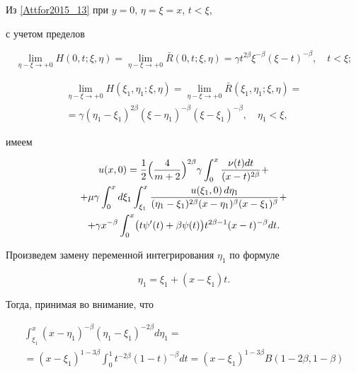 Из \eqref{Attfor2015_13} при $y=0$, $\eta=\xi=x$, $t<\xi$, 

с учетом пределов

$$

\lim\limits_{\eta-\xi\rightarrow +0} H(0,t;\xi,\eta)=

\lim\limits_{\eta-\xi\rightarrow +0} \bar{R}(0,t;\xi,\eta)=

\gamma t^{2\beta}\xi^{-\beta} (\xi-t)^{-\beta}, \quad t<\xi;

$$

\begin{multline}

\lim\limits_{\eta-\xi\rightarrow +0} H(\xi_1,\eta_1;\xi,\eta)=

\lim\limits_{\eta-\xi\rightarrow +0} \bar{R}(\xi_1,\eta_1;\xi,\eta)= \\ =

\gamma (\eta_1-\xi_1)^{2\beta} (\xi-\eta_1)^{-\beta} (\xi-\xi_1)^{-\beta}, \quad \eta_1<\xi,

\end{multline}

имеем

\begin{multline}

\label{Attfor2015_14}

u(x , 0)=\frac{1}{2}\Bigl(\frac{4}{m+2} \Bigr)^{2\beta}\gamma

 \int _0^x \frac{\nu(t)dt}{(x-t)^{2\beta}}+

\\

+\mu\gamma \int _0^x d\xi_1  \int _{\xi_1}^x

\frac{u(\xi_1 , 0)\,d\eta_1}{(\eta_1-\xi_1)^{2\beta}(x-\eta_1)^\beta(x-\xi_1)^\beta} +

\\

+\gamma x^{-\beta} \int _0^x \bigl(t\psi'(t)+\beta\psi(t)\bigr) t^{2\beta-1}(x-t)^{-\beta}dt.

\end{multline}



Произведем замену переменной интегрирования $\eta_1$ по формуле 

$$\eta_1=\xi_1+(x-\xi_1)t.$$

Тогда, принимая во внимание, что

\begin{multline}

 \int _{\xi_1}^x (x-\eta_1)^{-\beta}(\eta_1-\xi_1)^{-2\beta}d\eta_1= \\ =

(x-\xi_1)^{1-3\beta} \int _0^1 t^{-2\beta}(1-t)^{-\beta}dt=

(x-\xi_1)^{1-3\beta}B(1-2\beta , 1-\beta)

\end{multline}

